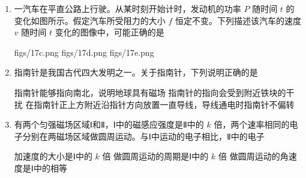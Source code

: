 \documentclass[\gkver]{gaokaozhenti}
\begin{document}
\begin{enumerate}

{东偏南方向，$1.9\times10^{3}\Ums$}
{西偏北方向，$2.7\times10^{3}\Ums$}
{东偏南方向，$2.7\times10^{3}\Ums$}


\item
一汽车在平直公路上行驶。从某时刻开始计时，发动机的功率 $P$ 随时间 $t$ 的变化如图所示。假定汽车所受阻力的大小 $f$ 恒定不变。下列描述该汽车的速度 $v$ 随时间 $t$ 变化的图像中，可能正确的是


{figs/17c.png}
{figs/17d.png}
{figs/17e.png}


\item
指南针是我国古代四大发明之一。关于指南针，下列说明正确的是

{指南针能够指向南北，说明地球具有磁场}
{指南针的指向会受到附近铁块的干扰}
{在指南针正上方附近沿指针方向放置一直导线，导线通电时指南针不偏转}


\item
有两个匀强磁场区域Ⅰ和Ⅱ，Ⅰ中的磁感应强度是Ⅱ中的 $k$ 倍，两个速率相同的电子分别在两磁场区域做圆周运动。与Ⅰ中运动的电子相比，Ⅱ中的电子

{加速度的大小是Ⅰ中的 $k$ 倍}
{做圆周运动的周期是Ⅰ中的 $k$ 倍}
{做圆周运动的角速度是Ⅰ中的相等}



\end{enumerate}
\end{document}
